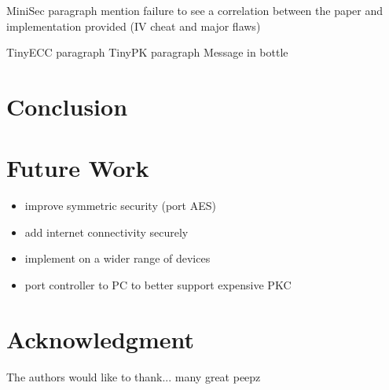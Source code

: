 \documentclass[conference]{./sty/IEEEtran}
\begin{document}
MiniSec paragraph \cite{MiniSec} mention failure to see a correlation between the paper and implementation provided (IV cheat and major flaws)



TinyECC paragraph \cite{TinyECC}
TinyPK paragraph \cite{TinyPK}
Message in bottle \cite{MessageBottle}

\section{Conclusion}


\section{Future Work} %
\label{sec:future_work}

\begin{itemize}
  \item improve symmetric security (port AES)
  \item add internet connectivity securely
  \item implement on a wider range of devices
  \item port controller to PC to better support expensive PKC
\end{itemize}



\section*{Acknowledgment}


The authors would like to thank... many great peepz







%
%
%






\end{document}
